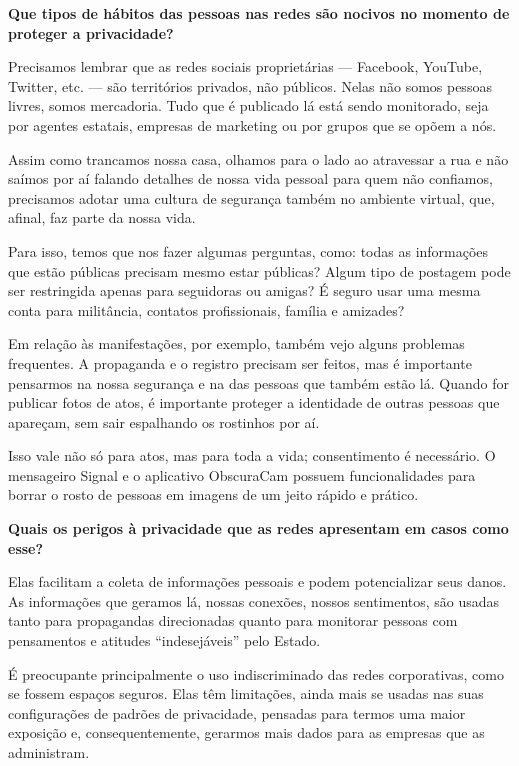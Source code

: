 \bigskip

\noindent{}\textbf{Que tipos de hábitos das pessoas nas redes são nocivos no
momento de proteger a privacidade? }

Precisamos lembrar que as redes sociais
proprietárias --- Facebook, YouTube, Twitter, etc. --- são territórios
privados, não públicos. Nelas não somos pessoas livres, somos mercadoria.
Tudo que é publicado lá está sendo monitorado, seja por agentes
estatais, empresas de marketing ou por grupos que se opõem a nós.

Assim como trancamos nossa casa, olhamos para o lado ao atravessar a rua
e não saímos por aí falando detalhes de nossa vida pessoal para quem não
confiamos, precisamos adotar uma cultura de segurança também no ambiente
virtual, que, afinal, faz parte da nossa vida.

Para isso, temos que nos fazer algumas perguntas, como: todas as
informações que estão públicas precisam mesmo estar públicas? Algum tipo
de postagem pode ser restringida apenas para seguidoras ou amigas? É
seguro usar uma mesma conta para militância, contatos profissionais,
família e amizades?

Em relação às manifestações, por exemplo, também vejo alguns problemas
frequentes. A propaganda e o registro precisam ser feitos, mas é
importante pensarmos na nossa segurança e na das pessoas que também
estão lá. Quando for publicar fotos de atos, é importante proteger a
identidade de outras pessoas que apareçam, sem sair espalhando os
rostinhos por aí.

Isso vale não só para atos, mas para toda a vida; consentimento é
necessário. O mensageiro Signal e
o aplicativo
ObscuraCam possuem funcionalidades para borrar o rosto de pessoas em imagens de
um jeito rápido e prático.

\bigskip

\noindent{}\textbf{Quais os perigos à privacidade que as redes apresentam em casos
como esse?}

Elas facilitam a coleta de informações pessoais e
podem potencializar seus danos. As informações que geramos lá, nossas
conexões, nossos sentimentos, são usadas tanto para propagandas
direcionadas quanto para monitorar pessoas com pensamentos e atitudes
``indesejáveis'' pelo Estado.

É preocupante principalmente o uso indiscriminado das redes
corporativas, como se fossem espaços seguros. Elas têm limitações, ainda
mais se usadas nas suas configurações de padrões de privacidade,
pensadas para termos uma maior exposição e, consequentemente, gerarmos
mais dados para as empresas que as administram.

